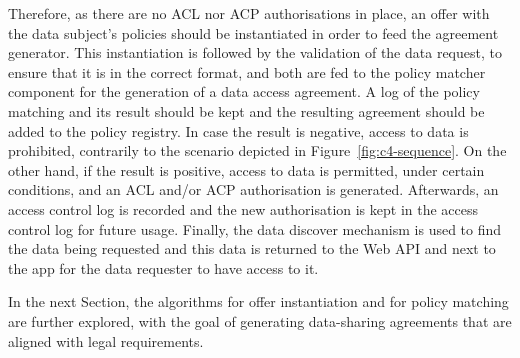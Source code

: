 Therefore, as there are no ACL nor ACP authorisations in place, an offer with the data subject's policies should be instantiated in order to feed the agreement generator.
This instantiation is followed by the validation of the data request, to ensure that it is in the correct format, and both are fed to the policy matcher component for the generation of a data access agreement.
A log of the policy matching and its result should be kept and the resulting agreement should be added to the policy registry.
In case the result is negative, access to data is prohibited, contrarily to the scenario depicted in Figure~\ref{fig:c4-sequence}.
On the other hand, if the result is positive, access to data is permitted, under certain conditions, and an ACL and/or ACP authorisation is generated.
Afterwards, an access control log is recorded and the new authorisation is kept in the access control log for future usage.
Finally, the data discover mechanism is used to find the data being requested and this data is returned to the Web API and next to the app for the data requester to have access to it.

In the next Section, the algorithms for offer instantiation and for policy matching are further explored, with the goal of generating data-sharing agreements that are aligned with legal requirements.